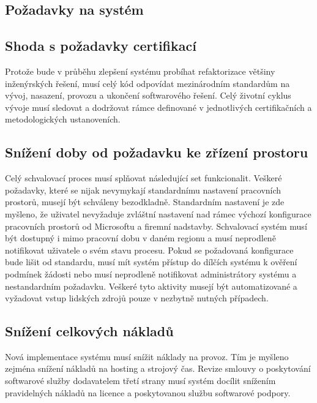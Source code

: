 \documentclass[12pt]{article}
\begin{document}
\begin{sloppypar}
\begin{spacing}{1.15}
        \section*{Požadavky na systém}
        \subsection*{Shoda s požadavky certifikací}
        Protože bude v průběhu zlepšení systému probíhat refaktorizace většiny
        inženýrských řešení, musí celý kód odpovídat mezinárodním standardům na
        vývoj, nasazení, provozu a ukončení softwarového řešení. Celý životní
        cyklus vývoje musí sledovat a dodržovat rámce definované v jednotlivých
        certifikačních a metodologických ustanoveních.

        \subsection*{Snížení doby od požadavku ke zřízení prostoru}
        Celý schvalovací proces musí splňovat následující set funkcionalit.
        Veškeré požadavky, které se nijak nevymykají standardnímu nastavení
        pracovních prostorů, musejí být schváleny bezodkladně. Standardním
        nastavení je zde myšleno, že uživatel nevyžaduje zvláštní nastavení nad
        rámec výchozí konfigurace pracovních prostorů od Microsoftu a firemní
        nadstavby. Schvalovací systém musí být dostupný i mimo pracovní dobu v
        daném regionu a musí neprodleně notifikovat uživatele o svém stavu
        procesu. Pokud se požadovaná konfigurace bude lišit od standardu, musí
        mít systém přístup do dílčích systému k ověření podmínek žádosti nebo
        musí neprodleně notifikovat administrátory systému a nestandardním
        požadavku. Veškeré tyto aktivity musejí být automatizované a vyžadovat
        vstup lidských zdrojů pouze v nezbytně nutných případech. 
        
        \subsection*{Snížení celkových nákladů}
        Nová implementace systému musí snížit náklady na provoz. Tím je myšleno
        zejména snížení nákladů na hosting a strojový čas. Revize smlouvy o
        poskytování softwarové služby dodavatelem třetí strany musí systém
        docílit snížením pravidelných nákladů na licence a poskytovanou službu
        softwarové podpory.


\end{spacing}
\end{sloppypar}
\end{document}

